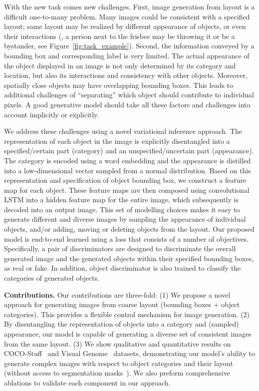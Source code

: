 \documentclass[10pt,twocolumn,letterpaper]{article}
\begin{document}
With the new task comes new challenges. 
First, image generation from layout is a difficult one-to-many problem. 
Many images could be consistent with a specified layout; same layout may be realized by different appearance of objects, or even their interactions (\eg, a person next to the frisbee may be throwing it or be a bystander, see Figure~\ref{fig:task_example}).
Second, the information conveyed by a bounding box and corresponding label is very limited. The actual appearance of the object displayed in an image is not only determined by its category and location, but also its interactions and consistency with other objects.
Moreover, spatially close objects may have overlapping bounding boxes. 
This leads to additional challenges of ``separating'' which object should contribute to individual pixels. 
A good generative model should take all these factors and challenges into account implicitly or explicitly. 


We address these challenges using a novel variational inference approach.  
The representation of each object in the image is explicitly disentangled into a specified/certain part (category) and an unspecified/uncertain part (appearance).
The category is encoded using a word embedding and the appearance is distilled into a low-dimensional vector sampled from a normal distribution. 
Based on this representation and specification of object bounding box, we construct a feature map for each object. These feature maps are then composed using convolutional LSTM into a hidden feature map for the entire image, which subsequently is decoded into an output image. 
This set of modelling choices makes it easy to generate different and diverse images by sampling the appearance of individual objects, and/or adding, moving or deleting objects from the layout.
Our proposed model is end-to-end learned using a loss that consists of a number of objectives.
Specifically, a pair of discriminators are designed to discriminate the overall generated image and the generated objects within their specified bounding boxes, as real or fake. In addition, object discriminator is also trained to classify the categories of generated objects. 









\noindent
{\bf Contributions.}
Our contributions are three-fold:
(1) We propose a novel approach for generating images from coarse layout (bounding boxes + object categories). This provides a flexible control mechanism for image generation. 
(2) By disentangling the representation of objects into a category and (sampled) appearance, our model is capable of generating a diverse set of consistent images from the same layout.
(3) We show qualitative and quantitative results on COCO-Stuff~\cite{caesar2016coco} and Visual Genome~\cite{krishna2017visual} datasets, demonstrating our model's ability to generate complex images with respect to object categories and their layout (without access to segmentation masks~\cite{hong2018inferring,Johnson2018}). 
We also preform comprehensive ablations to validate each component in our approach.
\end{document}
